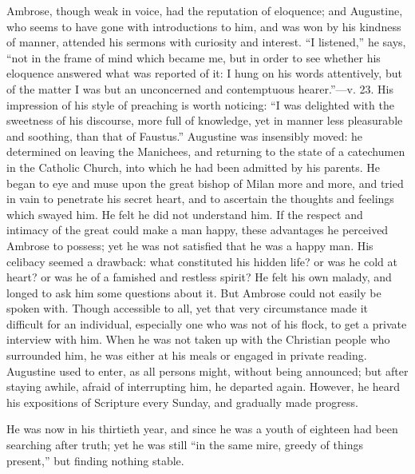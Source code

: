 Ambrose, though weak in voice, had the reputation of eloquence; and
Augustine, who seems to have gone with introductions to him, and was
won by his kindness of manner, attended his sermons with curiosity and
interest. ``I listened,'' he says, ``not in the
frame of mind which became me, but in order to see whether his
eloquence answered what was reported of it: I hung on his words
attentively, but of the matter I was but an unconcerned and
contemptuous hearer.''—v. 23. His impression of his style of
preaching is worth noticing: ``I was delighted with the sweetness
of his discourse, more full of knowledge, yet in manner less
pleasurable and soothing, than that of Faustus.'' Augustine was
insensibly moved: he determined on leaving the Manichees, and
returning to the state of a catechumen in the Catholic Church, into
which he had been admitted by his parents. He began to eye and muse
upon the great bishop of Milan more and more, and tried in vain to
penetrate his secret heart, and to ascertain the thoughts and feelings
which swayed him. He felt he did not understand him. If the respect
and intimacy of the great could make a man happy, these advantages he
perceived Ambrose to possess; yet he was not satisfied that he was a
happy man. His celibacy seemed a drawback: what constituted his hidden
life? or was he cold at heart? or was he of a famished and restless
spirit? He felt his own malady, and longed to ask him some questions
about it. But Ambrose could not easily be spoken with. Though
accessible to all, yet that very circumstance made it difficult for an
individual, especially one who was not of his flock, to get a private
interview with him. When he was not taken up with the Christian people
who surrounded him, he was either at his meals or engaged in private
reading. Augustine used to enter, as all persons might, without being
announced; but after staying awhile, afraid of interrupting him, he
departed again. However, he heard his expositions of Scripture every
Sunday, and gradually made progress.

He was now in his thirtieth year, and since he was a youth of
eighteen had been searching after truth; yet he was still ``in the
same mire, greedy of things present,'' but finding nothing stable.

